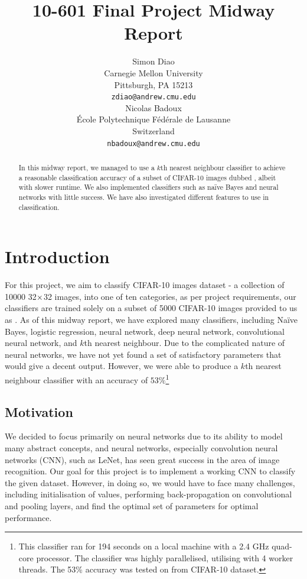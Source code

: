 \documentclass{article} %
\title{10-601 Final Project Midway Report}
\author{
Simon Diao\\
Carnegie Mellon University\\
Pittsburgh, PA 15213 \\
\texttt{zdiao@andrew.cmu.edu} \\
\And
Nicolas Badoux \\
\'Ecole Polytechnique F\'ed\'erale de Lausanne \\
Switzerland \\
\texttt{nbadoux@andrew.cmu.edu} \\
}
\begin{document}
\maketitle

\begin{abstract}
In this midway report, we managed to use a $k$th nearest neighbour classifier to achieve a reasonable classification accuracy of a subset of CIFAR-10 images dubbed , albeit with slower runtime. We also implemented classifiers such as na\"ive Bayes and neural networks with little success. We have also investigated different features to use in classification.
\end{abstract}

\section{Introduction}

For this project, we aim to classify CIFAR-10 images dataset - a collection of 10000 32$\times$32 images, into one of ten categories, as per project requirements,
our classifiers are trained solely on a subset of 5000 CIFAR-10 images provided to us as . As of this midway report, we have explored many
classifiers, including Na\"ive Bayes, logistic regression, neural network, deep neural network, convolutional neural network, and $k$th nearest neighbour. Due
to the complicated nature of neural networks, we have not yet found a set of satisfactory parameters that would give a decent output. However, we were able to
produce a $k$th nearest neighbour classifier with an accuracy of $53\%$\footnote{This classifier ran for 194 seconds on a local machine with a 2.4 GHz quad-core
processor. The classifier was highly parallelised, utilising  with 4 worker threads. The 53\% accuracy was tested on  from 
CIFAR-10 dataset.}

\subsection{Motivation}

We decided to focus primarily on neural networks due to its ability to model many abstract concepts, and neural networks, especially convolution neural networks (CNN), such as LeNet,
has seen great success in the area of image recognition. Our goal for this project is to implement a working CNN to classify the given dataset. However, in doing so, we would have 
to face many challenges, including initialisation of values, performing back-propagation on convolutional and pooling layers, and find the optimal set of parameters for optimal
performance.
\end{document}
